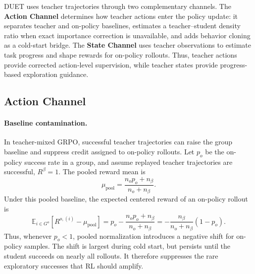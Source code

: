 DUET uses teacher trajectories through two complementary channels.
The \textbf{Action Channel} determines how teacher actions enter the policy update: it separates teacher and on-policy baselines, estimates a teacher--student density ratio when exact importance correction is unavailable, and adds behavior cloning as a cold-start bridge.
The \textbf{State Channel} uses teacher observations to estimate task progress and shape rewards for on-policy rollouts.
Thus, teacher actions provide corrected action-level supervision, while teacher states provide progress-based exploration guidance.

\subsection{Action Channel}
\label{sec:action_channel}

\paragraph{Baseline contamination.}
In teacher-mixed GRPO, successful teacher trajectories can raise the group baseline and suppress credit assigned to on-policy rollouts.
Let $p_o$ be the on-policy success rate in a group, and assume replayed teacher trajectories are successful, $R^\beta=1$.
The pooled reward mean is
\begin{equation}
\mu_{\mathrm{pool}}
=
\frac{n_o p_o+n_\beta}{n_o+n_\beta}.
\label{eq:pooled_mean}
\end{equation}
Under this pooled baseline, the expected centered reward of an on-policy rollout is
\begin{equation}
\mathbb{E}_{i\in G^o}
\left[
R^{o,(i)}-\mu_{\mathrm{pool}}
\right]
=
p_o-\frac{n_o p_o+n_\beta}{n_o+n_\beta}
=
-\frac{n_\beta}{n_o+n_\beta}(1-p_o).
\label{eq:baseline_contamination}
\end{equation}
Thus, whenever $p_o<1$, pooled normalization introduces a negative shift for on-policy samples.
The shift is largest during cold start, but persists until the student succeeds on nearly all rollouts.
It therefore suppresses the rare exploratory successes that RL should amplify.

